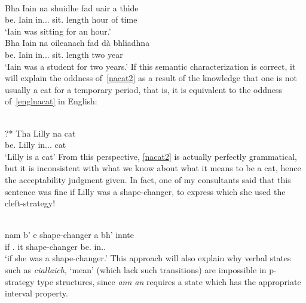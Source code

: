 \documentclass[output=paper]{langsci/langscibook}
\begin{document}
\ea {}\\
 \gll  Bha Iain na shuidhe fad uair a th\`ide\\
be.\Pst{} Iain in.\Poss.\Tsg.\M{} sit.\Vn{} length hour of time\\
\glt \enquote*{Iain was sitting for an hour.}
\ex {}\\
\gll  Bha Iain na oileanach fad d\`a bhliadhna\\
be.\Pst{} Iain in.\Poss.\Tsg.\M{} sit.\Vn{} length two year\\
\glt \enquote*{Iain was a student for two years.}
\z
If this semantic characterization is correct, it will explain the oddness
of~\eqref{nacat2} as a result of the knowledge that one is not usually a cat for a
temporary period, that is, it is equivalent to the oddness of~\eqref{englnacat} in
English:

\ea {}\\
    \gll ?* Tha Lilly na cat\\
         {} be.\Prs{} Lilly in.\Poss.\Tsg.\glossF{} cat\\
    \glt {} \enquote*{Lilly is a cat}\label{nacat2}
\label{englnacat}
\z
From this perspective, \eqref{nacat2} is actually perfectly grammatical, but it is
inconsistent with what we know about what it means to be a cat, hence the
acceptability judgment given. In fact, one of my consultants said that this
sentence was fine if Lilly was a shape-changer, to express which she used the
cleft-strategy!

\ea {}\\
\gll  nam b' e shape-changer a bh' innte\\
if \Cop.\Cond{} it shape-changer \Rel{} be.\Pst{} in.\Tsg.\glossF{}\\
\glt \enquote*{if she was a shape-changer.}
\z
This approach will also explain why verbal states such as \emph{ciallaich},
`mean' (which lack such transitions) are impossible in p-strategy type
structures, since \emph{ann an} requires a state which has the appropriate
interval property.

%
%
%
\end{document}
